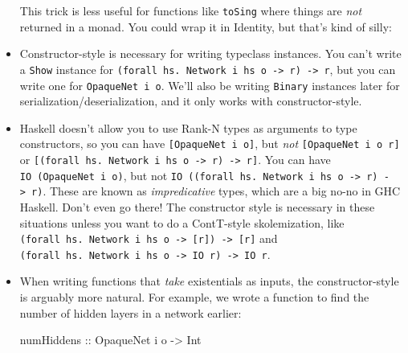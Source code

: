 \documentclass[]{article}
\newenvironment{Shaded}{}{}
\newcommand{\KeywordTok}[1]{\textcolor[rgb]{0.00,0.44,0.13}{\textbf{{#1}}}}
\newcommand{\DataTypeTok}[1]{\textcolor[rgb]{0.56,0.13,0.00}{{#1}}}
\newcommand{\CommentTok}[1]{\textcolor[rgb]{0.38,0.63,0.69}{\textit{{#1}}}}
\newcommand{\OtherTok}[1]{\textcolor[rgb]{0.00,0.44,0.13}{{#1}}}
\newcommand{\FunctionTok}[1]{\textcolor[rgb]{0.02,0.16,0.49}{{#1}}}
\newcommand{\NormalTok}[1]{{#1}}
\begin{document}
\begin{itemize}
  This trick is less useful for functions like \texttt{toSing} where things are
  \emph{not} returned in a monad. You could wrap it in Identity, but that's kind
  of silly:

\begin{Shaded}
\end{Shaded}
\item
  Constructor-style is necessary for writing typeclass instances. You can't
  write a \texttt{Show} instance for
  \texttt{(forall\ hs.\ Network\ i\ hs\ o\ -\textgreater{}\ r)\ -\textgreater{}\ r},
  but you can write one for \texttt{OpaqueNet\ i\ o}. We'll also be writing
  \texttt{Binary} instances later for serialization/deserialization, and it only
  works with constructor-style.
\item
  Haskell doesn't allow you to use Rank-N types as arguments to type
  constructors, so you can have \texttt{{[}OpaqueNet\ i\ o{]}}, but \emph{not}
  \texttt{{[}OpaqueNet\textquotesingle{}\ i\ o\ r{]}} or
  \texttt{{[}(forall\ hs.\ Network\ i\ hs\ o\ -\textgreater{}\ r)\ -\textgreater{}\ r{]}}.
  You can have \texttt{IO\ (OpaqueNet\ i\ o)}, but not
  \texttt{IO\ ((forall\ hs.\ Network\ i\ hs\ o\ -\textgreater{}\ r)\ -\textgreater{}\ r)}.
  These are known as \emph{impredicative} types, which are a big no-no in GHC
  Haskell. Don't even go there! The constructor style is necessary in these
  situations unless you want to do a ContT-style skolemization, like
  \texttt{(forall\ hs.\ Network\ i\ hs\ o\ -\textgreater{}\ {[}r{]})\ -\textgreater{}\ {[}r{]}}
  and
  \texttt{(forall\ hs.\ Network\ i\ hs\ o\ -\textgreater{}\ IO\ r)\ -\textgreater{}\ IO\ r}.
\item
  When writing functions that \emph{take} existentials as inputs, the
  constructor-style is arguably more natural. For example, we wrote a function
  to find the number of hidden layers in a network earlier:

\begin{Shaded}
\begin{Highlighting}[]
\OtherTok{numHiddens ::} \DataTypeTok{OpaqueNet} \NormalTok{i o }\OtherTok{->} \DataTypeTok{Int}
\end{Highlighting}
\end{Shaded}


\end{itemize}
\end{document}
